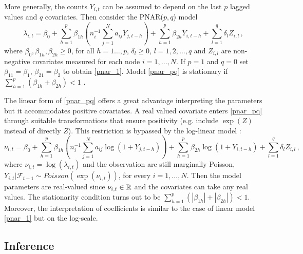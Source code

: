 More generally, the counts $Y_{i,t}$ can be assumed to depend on the last $p$ lagged values and $q$ covariates. Then consider the PNAR($p,q$) model
\begin{equation}
	\lambda_{i,t}=\beta_0+\sum_{h=1}^{p}\beta_{1h}\left( n_i^{-1}\sum_{j=1}^{N}a_{ij}Y_{j,t-h}\right) +\sum_{h=1}^{p}\beta_{2h}Y_{i,t-h} + \sum_{l=1}^{q}\delta_lZ_{i,l}\,,
	\label{pnar_pq}
\end{equation}
where $\beta_0, \beta_{1h}, \beta_{2h} \geq 0$, for all $h=1\dots,p$, $\delta_{l} \geq 0$, $l=1,2,\dots,q$  and $Z_{i,l}$ are non-negative covariates measured for each node $i=1,\dots,N$. If $p=1$ and $q=0$ set $\beta_{11}=\beta_1$, $\beta_{21}=\beta_2$ to obtain \eqref{pnar_1}. Model \eqref{pnar_pq} is stationary if $\sum_{h=1}^{p}(\beta_{1h}+\beta_{2h})<1$ \citep{armillotta_fokianos_2021}.

The linear form of \eqref{pnar_pq} offers  a great advantage interpreting  the parameters but  it accommodates  positive covariates.  A real valued covariate enters  \eqref{pnar_pq}  
through suitable transformations that  ensure positivity (e.g. include $\exp(Z)$ instead of directly $Z$). This restriction is bypassed by the log-linear model \citep{armillotta_fokianos_2021}:
\begin{equation}
	\nu_{i,t}=\beta_0+\sum_{h=1}^{p}\beta_{1h}\left(n_i^{-1}\sum_{j=1}^{N}a_{ij}\log(1+Y_{j,t-h})\right) +\sum_{h=1}^{p}\beta_{2h}\log(1+Y_{i,t-h}) + \sum_{l=1}^{q}\delta_lZ_{i,l} \,,
	\label{log_pnar_pq}
\end{equation}
where $\nu_{i,t}=\log(\lambda_{i,t})$ and the observation are still marginally Poisson, $	Y_{i,t}|\mathcal{F}_{t-1}\sim Poisson(\exp(\nu_{i,t}))$, for every $i=1,\dots,N$. Then the  model parameters are real-valued  since $\nu_{i,t}\in\mathbb{R}$ and the covariates can take any real values. The stationarity condition turns out to be $\sum_{h=1}^{p}(|\beta_{1h}|+|\beta_{2h}|)<1$. Moreover, the interpretation of coefficients is similar to the case of linear model \eqref{pnar_1} but on the log-scale.



\subsection{Inference} \label{subsec:Inference}

